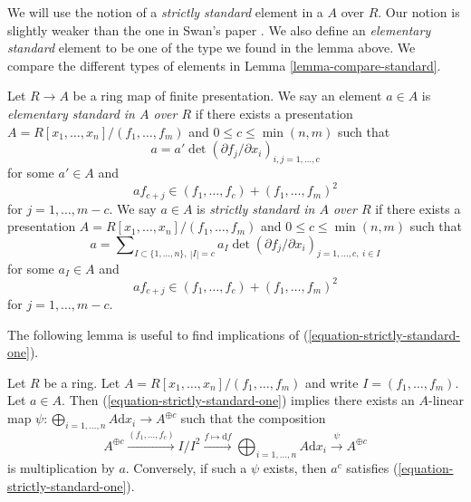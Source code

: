 \noindent
We will use the notion of a {\it strictly standard} element in
a $A$ over $R$. Our notion is slightly weaker than the
one in Swan's paper \cite{swan}. We also define an {\it elementary
standard} element to be one of the type we found in the lemma above.
We compare the different types of elements in
Lemma \ref{lemma-compare-standard}.

\begin{definition}
\label{definition-strictly-standard}
Let $R \to A$ be a ring map of finite presentation.
We say an element $a \in A$ is {\it elementary standard in $A$ over $R$}
if there exists a presentation
$A = R[x_1, \ldots, x_n]/(f_1, \ldots, f_m)$
and $0 \leq c \leq \min(n, m)$ such that
\begin{equation}
\label{equation-elementary-standard-one}
a = a' \det(\partial f_j/\partial x_i)_{i, j = 1, \ldots, c}
\end{equation}
for some $a' \in A$ and
\begin{equation}
\label{equation-elementary-standard-two}
a f_{c + j} \in (f_1, \ldots, f_c) + (f_1, \ldots, f_m)^2
\end{equation}
for $j = 1, \ldots, m - c$. We say $a \in A$ is
{\it strictly standard in $A$ over $R$} if there exists a presentation
$A = R[x_1, \ldots, x_n]/(f_1, \ldots, f_m)$
and $0 \leq c \leq \min(n, m)$ such that
\begin{equation}
\label{equation-strictly-standard-one}
a = \sum\nolimits_{I \subset \{1, \ldots, n\},\ |I| = c}
a_I \det(\partial f_j/\partial x_i)_{j = 1, \ldots, c,\ i \in I}
\end{equation}
for some $a_I \in A$ and
\begin{equation}
\label{equation-strictly-standard-two}
a f_{c + j} \in (f_1, \ldots, f_c) + (f_1, \ldots, f_m)^2
\end{equation}
for $j = 1, \ldots, m - c$.
\end{definition}

\noindent
The following lemma is useful to find implications of
(\ref{equation-strictly-standard-one}).

\begin{lemma}
\label{lemma-parse-equation-strictly-standard-one}
Let $R$ be a ring. Let $A = R[x_1, \ldots, x_n]/(f_1, \ldots, f_m)$
and write $I = (f_1, \ldots, f_m)$. Let $a \in A$. Then
(\ref{equation-strictly-standard-one}) implies
there exists an $A$-linear map
$\psi : \bigoplus\nolimits_{i = 1, \ldots, n} A \text{d}x_i \to A^{\oplus c}$
such that the composition
$$
A^{\oplus c} \xrightarrow{(f_1, \ldots, f_c)}
I/I^2 \xrightarrow{f \mapsto \text{d}f}
\bigoplus\nolimits_{i = 1, \ldots, n} A \text{d}x_i
\xrightarrow{\psi}
A^{\oplus c}
$$
is multiplication by $a$. Conversely, if such a $\psi$ exists, then
$a^c$ satisfies (\ref{equation-strictly-standard-one}).
\end{lemma}

